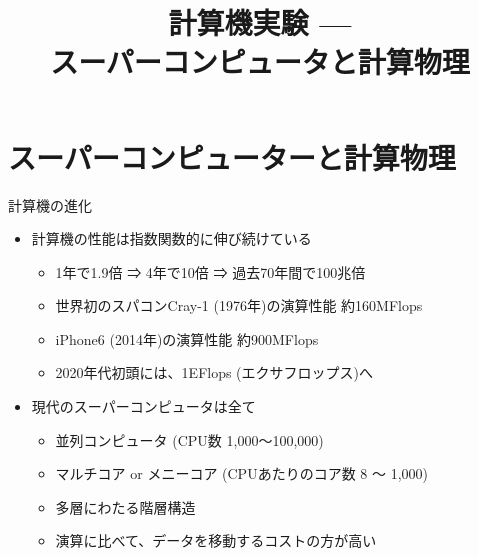 \documentclass[dvipdfmx]{beamer}
\title{計算機実験 --- \\ スーパーコンピュータと計算物理}
\begin{document}

\begin{frame}
  \titlepage
  \tableofcontents
\end{frame}

\section{スーパーコンピューターと計算物理}

\begin{frame}[t,fragile]{計算機の進化}
  \begin{itemize}
    \setlength{\itemsep}{1em}
  \item 計算機の性能は指数関数的に伸び続けている
    \begin{itemize}
    \item 1年で1.9倍 ⇒ 4年で10倍 ⇒ 過去70年間で100兆倍
    \item 世界初のスパコンCray-1 (1976年)の演算性能 約160MFlops
    \item iPhone6 (2014年)の演算性能 約900MFlops
    \item 2020年代初頭には、1EFlops (エクサフロップス)へ
    \end{itemize}
  \item 現代のスーパーコンピュータは全て
    \begin{itemize}
      \item 並列コンピュータ (CPU数 1,000〜100,000)
      \item マルチコア or メニーコア (CPUあたりのコア数 8 〜 1,000)
      \item 多層にわたる階層構造
      \item 演算に比べて、データを移動するコストの方が高い
    \end{itemize}
  \end{itemize}
\end{frame}
\end{document}
